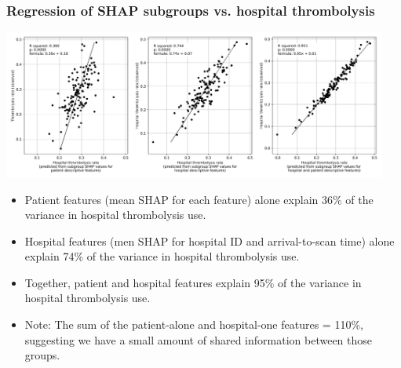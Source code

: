 \begin{frame}
\frametitle{Regression of SHAP subgroups vs. hospital thrombolysis}

\begin{center}
\includegraphics[width=0.95\textwidth]{./images/03e_xgb_10_features_multiple_regression_patient_hosptia_mean.jpg}
\end{center}

\scriptsize
\begin{itemize}
    \item Patient features (mean SHAP for each feature) alone explain 36\% of the variance in hospital thrombolysis use.
    \item Hospital features (men SHAP for hospital ID and arrival-to-scan time) alone explain 74\% of the variance in hospital thrombolysis use.
    \item Together, patient and hospital features explain 95\% of the variance in hospital thrombolysis use.
    \item Note: The sum of the patient-alone and hospital-one features = 110\%, suggesting we have a small amount of shared information between those groups.
\end{itemize}
 
\end{frame}